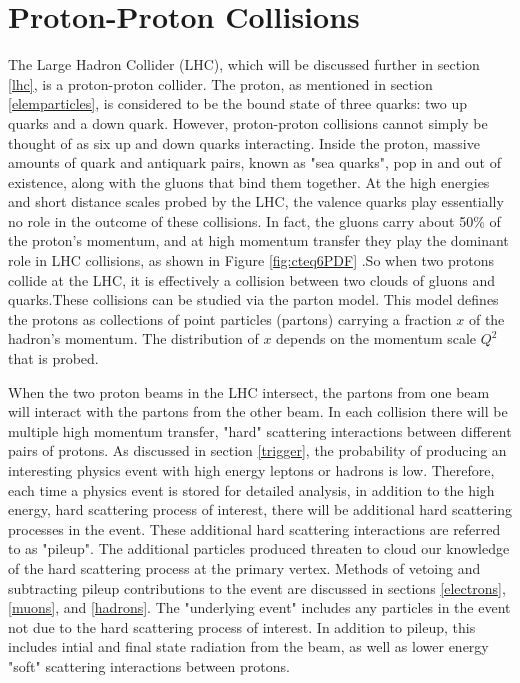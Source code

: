 \documentclass[oneside, letterpaper, oldfontcommands]{memoir}
\begin{document}
\section{Proton-Proton Collisions}\label{ppcoll}
\qquad The Large Hadron Collider (LHC), which will be discussed further in section \ref{lhc}, is a proton-proton collider. The proton, as mentioned in section \ref{elemparticles}, is considered to be the bound state of three quarks: two up quarks and a down quark. However, proton-proton collisions cannot simply be thought of as six up and down quarks interacting. Inside the proton, massive amounts of quark and antiquark pairs, known as "sea quarks", pop in and out of existence, along with the gluons that bind them together. At the high energies and short distance scales probed by the LHC, the valence quarks play essentially no role in the outcome of these collisions. In fact, the gluons carry about 50$\%$ of the proton's momentum\cite{Halzen:1984mc}, and at high momentum transfer they play the dominant role in LHC collisions, as shown in Figure \ref{fig:cteq6PDF} .So when two protons collide at the LHC, it is effectively a collision between two clouds of gluons and quarks.These collisions can be studied via the parton model. This model defines the protons as collections of point particles (partons) carrying a fraction $x$ of the hadron's momentum. The distribution of $x$ depends on the momentum scale $Q^{2}$ that is probed. 

\qquad When the two proton beams in the LHC intersect, the partons from one beam will interact with the partons from the other beam. In each collision there will be multiple high momentum transfer, "hard" scattering interactions between different pairs of protons. As discussed in section \ref{trigger}, the probability of producing an interesting physics event with high energy leptons or hadrons is low. Therefore, each time a physics event is stored for detailed analysis, in addition to the high energy, hard scattering process of interest, there will be additional hard scattering processes in the event. These additional hard scattering interactions are referred to as "pileup". The additional particles produced threaten to cloud our knowledge of the hard scattering process at the primary vertex. Methods of vetoing and subtracting pileup contributions to the event are discussed in sections \ref{electrons}, \ref{muons}, and \ref{hadrons}. The "underlying event" includes any particles in the event not due to the hard scattering process of interest. In addition to pileup, this includes intial and final state radiation from the beam, as well as lower energy "soft" scattering interactions between protons. 
\end{document}
